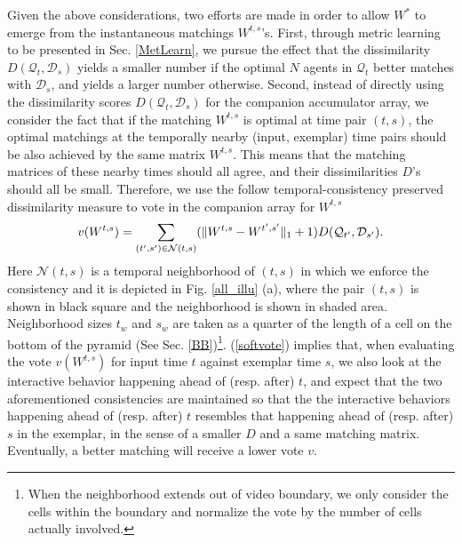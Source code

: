 Given the above considerations, two efforts are made in order to allow $W^{*}$ to emerge from the instantaneous matchings $W^{t,s}$'s. First, through metric learning to be presented in Sec. \ref{MetLearn}, we pursue the effect that the dissimilarity $D(\mathcal{Q}_{t}, \mathcal{D}_{s})$ yields a smaller number if the optimal $N$ agents in $\mathcal{Q}_{t}$ better matches with $\mathcal{D}_{s}$, and yields a larger number otherwise. Second, instead of directly using the dissimilarity scores $D(\mathcal{Q}_{t}, \mathcal{D}_{s})$ for the companion accumulator array, we consider the fact that if the matching $W^{t,s}$ is optimal at time pair $(t,s)$, the optimal matchings at the temporally nearby (input, exemplar) time pairs should be also achieved by the same matrix $W^{t,s}$. This means that the matching matrices of these nearby times should all agree, and their dissimilarities $D$'s should all be small. Therefore, we use the follow temporal-consistency preserved dissimilarity measure to vote in the companion array for $W^{t,s}$
\begin{equation}
\vspace{-5pt}
\label{softvote}
v(W^{t,s})=\sum_{(t',s')\in\mathcal{N}(t,s)}(\|W^{t,s}-W^{t',s'}\|_{1}+1)D(\mathcal{Q}_{t'}, \mathcal{D}_{s'}).
\end{equation}
Here $\mathcal{N}(t,s)$ is a temporal neighborhood of $(t,s)$ in which we enforce the consistency and it is depicted in Fig. \ref{all_illu} (a), where the pair $(t,s)$ is shown in black square and the neighborhood is shown in shaded area. Neighborhood sizes $t_{w}$ and $s_{w}$ are taken as a quarter of the length of a cell on the bottom of the pyramid (See Sec. \ref{BB})\footnote{When the neighborhood extends out of video boundary, we only consider the cells within the boundary and normalize the vote by the number of cells actually involved.}. (\ref{softvote}) implies that, when evaluating the vote $v(W^{t,s})$ for input time $t$ against exemplar time $s$, we also look at the interactive behavior happening ahead of (resp. after) $t$, and expect that the two aforementioned consistencies are maintained so that the the interactive behaviors happening ahead of (resp. after) $t$ resembles that happening ahead of (resp. after) $s$ in the exemplar, in the sense of a smaller $D$ and a same matching matrix. Eventually, a better matching will receive a lower vote $v$.
\vspace{-10pt}
